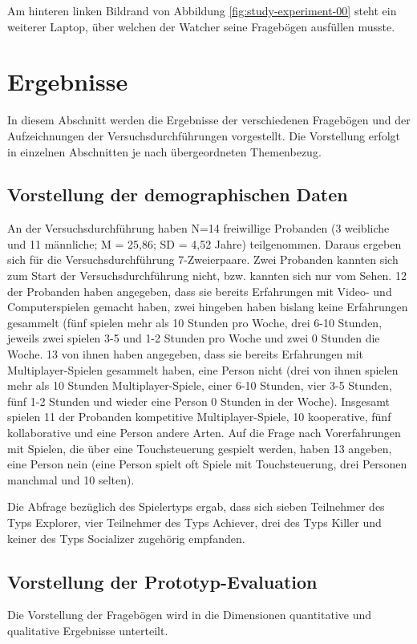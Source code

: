 Am hinteren linken Bildrand von Abbildung \ref{fig:study-experiment-00} steht ein weiterer Laptop, über welchen der Watcher seine Fragebögen ausfüllen musste.

\section{Ergebnisse}
In diesem Abschnitt werden die Ergebnisse der verschiedenen Fragebögen und der Aufzeichnungen der Versuchsdurchführungen vorgestellt.
Die Vorstellung erfolgt in einzelnen Abschnitten je nach übergeordneten Themenbezug.



\subsection{Vorstellung der demographischen Daten}
An der Versuchsdurchführung haben N=14 freiwillige Probanden (3 weibliche und 11 männliche; M = 25,86; SD = 4,52 Jahre) teilgenommen. Daraus ergeben sich für die Versuchsdurchführung 7-Zweierpaare. Zwei Probanden kannten sich zum Start der Versuchsdurchführung nicht, bzw. kannten sich nur vom Sehen. 12 der Probanden haben angegeben, dass sie bereits Erfahrungen mit Video- und Computerspielen gemacht haben, zwei hingeben haben bislang keine Erfahrungen gesammelt (fünf spielen mehr als 10 Stunden pro Woche, drei 6-10 Stunden, jeweils zwei spielen 3-5 und 1-2 Stunden pro Woche und zwei 0 Stunden die Woche. 13 von ihnen haben angegeben, dass sie bereits Erfahrungen mit Multiplayer-Spielen gesammelt haben, eine Person nicht (drei von ihnen spielen mehr als 10 Stunden Multiplayer-Spiele, einer 6-10 Stunden, vier 3-5 Stunden, fünf 1-2 Stunden und wieder eine Person 0 Stunden in der Woche). Insgesamt spielen 11 der Probanden kompetitive Multiplayer-Spiele, 10 kooperative, fünf kollaborative und eine Person andere Arten.
Auf die Frage nach Vorerfahrungen mit Spielen, die über eine Touchsteuerung gespielt werden, haben 13  angeben, eine Person nein (eine Person spielt oft Spiele mit Touchsteuerung, drei Personen manchmal und  10 selten).

Die Abfrage bezüglich des Spielertyps ergab, dass sich sieben Teilnehmer des Typs Explorer, vier Teilnehmer des Typs Achiever, drei des Typs Killer und keiner des Typs Socializer zugehörig empfanden.

\subsection{Vorstellung der Prototyp-Evaluation}
Die Vorstellung der Fragebögen wird in die Dimensionen quantitative und qualitative Ergebnisse unterteilt.

